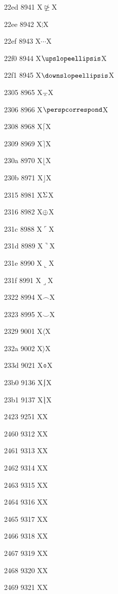 \documentclass[11pt]{article}
\begin{document}
22ed 8941 X{\ensuremath{\ntrianglerighteq}}X

22ee 8942 X{\ensuremath{\vdots}}X

22ef 8943 X{\ensuremath{\cdots}}X

22f0 8944 X{\ensuremath{\upslopeellipsis}}X

22f1 8945 X{\ensuremath{\downslopeellipsis}}X

2305 8965 X{\ensuremath{\barwedge}}X

2306 8966 X{\ensuremath{\perspcorrespond}}X

2308 8968 X{\ensuremath{\lceil}}X

2309 8969 X{\ensuremath{\rceil}}X

230a 8970 X{\ensuremath{\lfloor}}X

230b 8971 X{\ensuremath{\rfloor}}X

2315 8981 X{\ensuremath{\recorder}}X

2316 8982 X{\ensuremath{\mathchar"2208}}X

231c 8988 X{\ensuremath{\ulcorner}}X

231d 8989 X{\ensuremath{\urcorner}}X

231e 8990 X{\ensuremath{\llcorner}}X

231f 8991 X{\ensuremath{\lrcorner}}X

2322 8994 X{\ensuremath{\frown}}X

2323 8995 X{\ensuremath{\smile}}X

2329 9001 X{\ensuremath{\langle}}X

232a 9002 X{\ensuremath{\rangle}}X

233d 9021 X{\ensuremath{\obar}}X

23b0 9136 X{\ensuremath{\lmoustache}}X

23b1 9137 X{\ensuremath{\rmoustache}}X

2423 9251 X{\textvisiblespace}X

2460 9312 X{}X

2461 9313 X{}X

2462 9314 X{}X

2463 9315 X{}X

2464 9316 X{}X

2465 9317 X{}X

2466 9318 X{}X

2467 9319 X{}X

2468 9320 X{}X

2469 9321 X{}X
\end{document}
